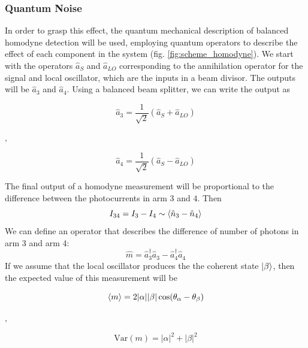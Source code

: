 \subsubsection{Quantum Noise}
In order to grasp this effect, the quantum mechanical description of balanced homodyne detection will be used, employing quantum operators to describe the effect of each component in the system (fig. \ref{fig:scheme_homodyne}). We start with the operators $\hat{a}_S$ and $\hat{a}_{LO}$ corresponding to the annihilation operator for the signal and local oscillator, which are the inputs in a beam divisor. The outputs will be $\hat{a}_3$ and $\hat{a}_4$.
Using a balanced beam splitter, we can write the output as
%
\begin{center}
	\begin{minipage}{48mm}
		\noindent
		\begin{equation}
			\hat{a}_3 = \frac{1}{\sqrt{2}} \left( \hat{a}_S + \hat{a}_{LO} \right)
		\end{equation}
	\end{minipage}
	$,\quad$
	\begin{minipage}{48mm}
		\noindent
		\begin{equation}
			\hat{a}_4 = \frac{1}{\sqrt{2}} \left( \hat{a}_S - \hat{a}_{LO} \right)
		\end{equation}
	\end{minipage}
\end{center}
%
The final output of a homodyne measurement will be proportional to the difference between the photocurrents in arm $3$ and $4$. Then
%
\begin{equation}
I_{34} = I_3 - I_4 \sim \braket{\hat{n}_3 - \hat{n}_4}
\end{equation}
%
We can define an operator that describes the difference of number of photons in arm 3 and arm 4:
%
\begin{equation}
\hat{m} = \hat{a}^\dagger_3\hat{a}_3 - \hat{a}^\dagger_4\hat{a}_4
\end{equation}
%
If we assume that the local oscillator produces the the coherent state $\ket{\beta}$, then the expected value of this measurement will be
%
\begin{center}
	\begin{minipage}{58mm}
		\noindent
		\begin{equation}
			\braket{m} = 2|\alpha||\beta|\cos({\theta_\alpha - \theta_\beta})
		\end{equation}
	\end{minipage}
	$,\quad$
	\begin{minipage}{46mm}
		\noindent
		\begin{equation}
			\textrm{Var}(m) = |\alpha|^2 + |\beta|^2
		\end{equation}
	\end{minipage}
\end{center}
